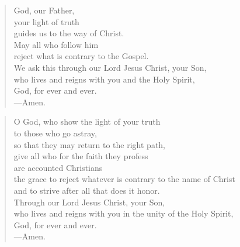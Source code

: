 \prayer

\setlength{\leftmargini}{\prayerleftmargini}

\begin{verse}
God, our Father,\\
your light of truth\\
guides us to the way of Christ.\\
May all who follow him\\
reject what is contrary to the Gospel.\\
We ask this through our Lord Jesus Christ, your Son,\\
who lives and reigns with you and the Holy Spirit,\\
God, for ever and ever.\\
{\color{red}---\thinspace}Amen.
\end{verse}


\begin{verse}
O God, who show the light of your truth\\
to those who go astray,\\
so that they may return to the right path,\\
give all who for the faith they profess\\
are accounted Christians\\
the grace to reject whatever is contrary to the name of Christ\\
and to strive after all that does it honor.\\
Through our Lord Jesus Christ, your Son,\\
who lives and reigns with you in the unity of the Holy Spirit,\\
God, for ever and ever.\\
{\color{red}---\thinspace}Amen.
\end{verse}

\setlength{\leftmargini}{\defleftmargini}
